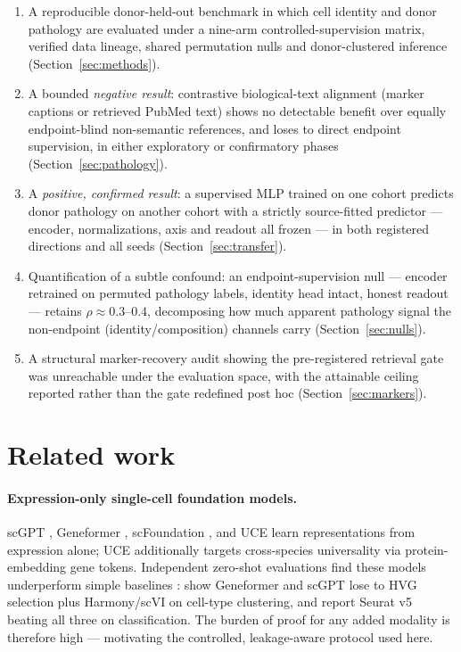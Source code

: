 \documentclass[11pt]{article}
\begin{document}
\begin{enumerate}
  \item A reproducible donor-held-out benchmark in which cell identity
    and donor pathology are evaluated under a nine-arm
    controlled-supervision matrix, verified data lineage, shared
    permutation nulls and donor-clustered inference
    (Section~\ref{sec:methods}).
  \item A bounded \emph{negative result}: contrastive biological-text
    alignment (marker captions or retrieved PubMed text) shows no
    detectable benefit over equally endpoint-blind non-semantic
    references, and loses to direct endpoint supervision, in either
    exploratory or confirmatory phases (Section~\ref{sec:pathology}).
  \item A \emph{positive, confirmed result}: a supervised MLP trained on
    one cohort predicts donor pathology on another cohort with a
    strictly source-fitted predictor --- encoder, normalizations, axis
    and readout all frozen --- in both registered directions and all
    seeds (Section~\ref{sec:transfer}).
  \item Quantification of a subtle confound: an endpoint-supervision
    null --- encoder retrained on permuted pathology labels, identity
    head intact, honest readout --- retains $\rho\approx0.3$--$0.4$,
    decomposing how much apparent pathology signal the non-endpoint
    (identity/composition) channels carry
    (Section~\ref{sec:nulls}).
  \item A structural marker-recovery audit showing the pre-registered
    retrieval gate was unreachable under the evaluation space, with the
    attainable ceiling reported rather than the gate redefined
    post hoc (Section~\ref{sec:markers}).
\end{enumerate}

\section{Related work}

\paragraph{Expression-only single-cell foundation models.}
scGPT \citep{scgpt}, Geneformer \citep{geneformer}, scFoundation
\citep{scfoundation}, and UCE \citep{uce} learn representations from
expression alone; UCE additionally targets cross-species universality via
protein-embedding gene tokens. Independent zero-shot evaluations find
these models underperform simple baselines \citep{kedzierska,scfm_limits}:
\citet{kedzierska} show Geneformer and scGPT lose to HVG selection plus
Harmony/scVI on cell-type clustering, and \citet{scfm_limits} report
Seurat v5 beating all three on classification. The burden of proof for
any added modality is therefore high --- motivating the controlled,
leakage-aware protocol used here.
\end{document}
